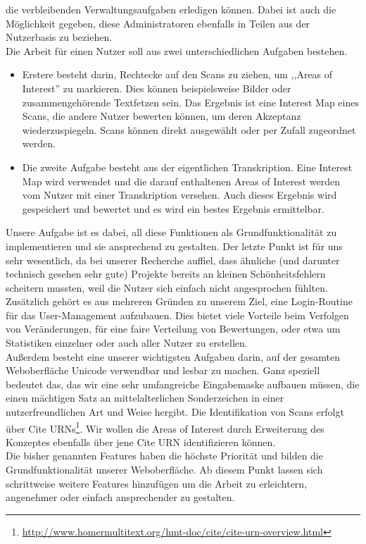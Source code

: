 \documentclass{article}
\begin{document}
die verbleibenden Verwaltungsaufgaben erledigen können.
Dabei ist auch die Möglichkeit gegeben, diese Administratoren ebenfalls in Teilen aus der Nutzerbasis zu beziehen.\\
Die Arbeit für einen Nutzer soll aus zwei unterschiedlichen Aufgaben bestehen.
\begin{itemize}
\item{Erstere besteht darin, Rechtecke auf den Scans zu ziehen, um ,,Areas of Interest'' zu markieren.
Dies können beispielsweise Bilder oder zusammengehörende Textfetzen sein.
Das Ergebnis ist eine Interest Map eines Scans, die andere Nutzer bewerten können, um deren Akzeptanz wiederzuspiegeln.
Scans können direkt ausgewählt oder per Zufall zugeordnet werden.}
\item{Die zweite Aufgabe besteht aus der eigentlichen Transkription.
Eine Interest Map wird verwendet und die darauf enthaltenen Areas of Interest werden vom Nutzer mit einer Transkription versehen.
Auch dieses Ergebnis wird gespeichert und bewertet und es wird ein bestes Ergebnis ermittelbar.}
\end{itemize}
Unsere Aufgabe ist es dabei, all diese Funktionen als Grundfunktionalität zu implementieren und sie ansprechend zu gestalten.
Der letzte Punkt ist für uns sehr wesentlich, da bei unserer Recherche auffiel, dass ähnliche (und darunter technisch gesehen sehr gute)
Projekte bereits an kleinen Schönheitsfehlern scheitern mussten, weil die Nutzer sich einfach nicht angesprochen fühlten.
Zusätzlich gehört es aus mehreren Gründen zu unserem Ziel, eine Login-Routine für das User-Management aufzubauen.
Dies bietet viele Vorteile beim Verfolgen von Veränderungen, für eine faire Verteilung von Bewertungen,
oder etwa um Statistiken einzelner oder auch aller Nutzer zu erstellen.\\
Außerdem besteht eine unserer wichtigsten Aufgaben darin, auf der gesamten Weboberfläche Unicode verwendbar und lesbar zu machen.
Ganz speziell bedeutet das, das wir eine sehr umfangreiche Eingabemaske aufbauen müssen,
die einen mächtigen Satz an mittelalterlichen Sonderzeichen in einer nutzerfreundlichen Art und Weise hergibt.
Die Identifikation von Scans erfolgt über Cite URNs\footnote{\url{http://www.homermultitext.org/hmt-doc/cite/cite-urn-overview.html}}.
Wir wollen die Areas of Interest durch Erweiterung des Konzeptes ebenfalls über jene Cite URN identifizieren können.\\
Die bisher genannten Features haben die höchste Priorität und bilden die Grundfunktionalität unserer Weboberfläche.
Ab diesem Punkt lassen sich schrittweise weitere Features hinzufügen um die Arbeit zu erleichtern, angenehmer oder einfach ansprechender zu gestalten.
\end{document}
